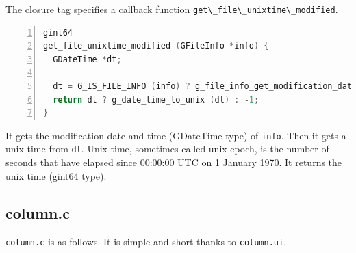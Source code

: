 The closure tag specifies a callback function
\passthrough{\lstinline!get\_file\_unixtime\_modified!}.

\begin{lstlisting}[language=C, numbers=left]
gint64
get_file_unixtime_modified (GFileInfo *info) {
  GDateTime *dt;

  dt = G_IS_FILE_INFO (info) ? g_file_info_get_modification_date_time (info) : NULL;
  return dt ? g_date_time_to_unix (dt) : -1;
}
\end{lstlisting}

It gets the modification date and time (GDateTime type) of
\passthrough{\lstinline!info!}. Then it gets a unix time from
\passthrough{\lstinline!dt!}. Unix time, sometimes called unix epoch, is
the number of seconds that have elapsed since 00:00:00 UTC on 1 January
1970. It returns the unix time (gint64 type).

\subsection{column.c}\label{column.c}

\passthrough{\lstinline!column.c!} is as follows. It is simple and short
thanks to \passthrough{\lstinline!column.ui!}.

